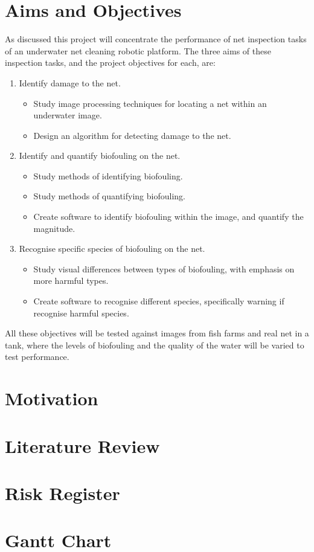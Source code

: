 \documentclass[11.5pt, twoside, a4paper]{article}
\begin{document}
\section{Aims and Objectives}
As discussed this project will concentrate the performance of net inspection tasks of an underwater net cleaning robotic platform. The three aims of these inspection tasks, and the project objectives for each, are:
\begin{enumerate}
\item Identify damage to the net.
\begin{itemize}
\item Study image processing techniques for locating a net within an underwater image.
\item Design an algorithm for detecting damage to the net.
\end{itemize}
\item Identify and quantify biofouling on the net.
\begin{itemize}
\item Study methods of identifying biofouling. %
\item Study methods of quantifying biofouling.
\item Create software to identify biofouling within the image, and quantify the magnitude.
\end{itemize}
\item Recognise specific species of biofouling on the net.
\begin{itemize}
\item Study visual differences between types of biofouling, with emphasis on more harmful types.
\item Create software to recognise different species, specifically warning if recognise harmful species.
\end{itemize}
\end{enumerate}
All these objectives will be tested against images from fish farms and real net in a tank, where the levels of biofouling and the quality of the water will be varied to test performance.


\section{Motivation}

\section{Literature Review}

\section{Risk Register}

\section{Gantt Chart}


{}
\end{document}
